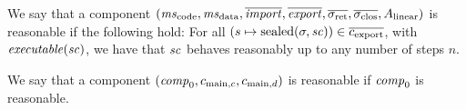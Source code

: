 \documentclass[a4paper]{article}
\begin{document}
  \begin{definition}
    \label{def:reasonable-component}
    We say that a component
    $(\mscode,\msdata,\overline{\var{import}},\overline{\var{export}},\sigrets,\sigcloss,A_\linear)$
    is reasonable if the following hold: For all $(s \mapsto \mathrm{sealed}(\sigma,\mathit{sc})) \in
    \overline{c_{\mathrm{export}}}$, with $\exec{\vsc}$, we have that $\mathit{sc}$
    behaves reasonably up to any number of steps $n$.

    We say that a component
    $(\mathit{comp}_0,c_{\mathrm{main},c}, c_{\mathrm{main},d})$ is reasonable if $\mathit{comp}_0$ is reasonable.
  \end{definition}



\end{document}
